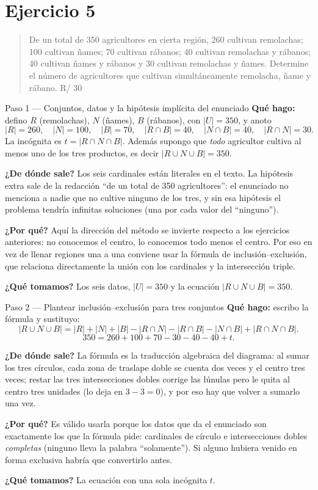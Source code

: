 \documentclass[11pt]{article}
\begin{document}
\section*{Ejercicio 5}

\begin{quote}
De un total de 350 agricultores en cierta región, 260 cultivan remolachas; 100 cultivan ñames; 70
cultivan rábanos; 40 cultivan remolachas y rábanos; 40 cultivan ñames y rábanos y 30 cultivan remolachas
y ñames. Determine el número de agricultores que cultivan simultáneamente remolacha, ñame y rábano.
\hfill R/ 30
\end{quote}

\begin{paso}{Paso 1 --- Conjuntos, datos y la hipótesis implícita del enunciado}
\textbf{Qué hago:} defino $R$ (remolachas), $N$ (ñames), $B$ (rábanos), con $|U|=350$, y anoto
\[
|R|=260,\quad |N|=100,\quad |B|=70,\quad |R\cap B|=40,\quad |N\cap B|=40,\quad |R\cap N|=30 .
\]
La incógnita es $t=|R\cap N\cap B|$. Además supongo que \emph{todo} agricultor cultiva al menos uno de los
tres productos, es decir $|R\cup N\cup B| = 350$.

\textbf{¿De dónde sale?} Los seis cardinales están literales en el texto. La hipótesis extra sale de la
redacción ``de un total de 350 agricultores'': el enunciado no menciona a nadie que no cultive ninguno de
los tres, y sin esa hipótesis el problema tendría infinitas soluciones (una por cada valor del ``ninguno'').

\textbf{¿Por qué?} Aquí la dirección del método se invierte respecto a los ejercicios anteriores: no
conocemos el centro, lo conocemos todo menos el centro. Por eso en vez de llenar regiones una a una
conviene usar la fórmula de inclusión--exclusión, que relaciona directamente la unión con los cardinales
y la intersección triple.

\textbf{¿Qué tomamos?} Los seis datos, $|U|=350$ y la ecuación $|R\cup N\cup B|=350$.
\end{paso}

\begin{paso}{Paso 2 --- Plantear inclusión--exclusión para tres conjuntos}
\textbf{Qué hago:} escribo la fórmula y sustituyo:
\[
|R\cup N\cup B| = |R|+|N|+|B| - |R\cap N| - |R\cap B| - |N\cap B| + |R\cap N\cap B| .
\]
\[
350 = 260+100+70 - 30 - 40 - 40 + t .
\]

\textbf{¿De dónde sale?} La fórmula es la traducción algebraica del diagrama: al sumar los tres círculos,
cada zona de traslape doble se cuenta dos veces y el centro tres veces; restar las tres intersecciones
dobles corrige las lúnulas pero le quita al centro tres unidades (lo deja en $3-3=0$), y por eso hay que
volver a sumarlo una vez.

\textbf{¿Por qué?} Es válido usarla porque los datos que da el enunciado son exactamente los que la
fórmula pide: cardinales de círculo e intersecciones dobles \emph{completas} (ninguno lleva la palabra
``solamente''). Si alguno hubiera venido en forma exclusiva habría que convertirlo antes.

\textbf{¿Qué tomamos?} La ecuación con una sola incógnita $t$.
\end{paso}
\end{document}
